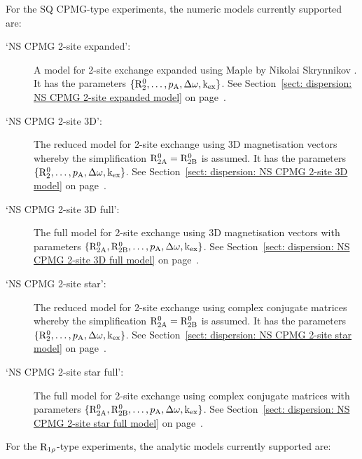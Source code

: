 For the SQ CPMG-type experiments, the numeric models currently supported are:

\begin{description}
\item[`NS CPMG 2-site expanded':]  A model for 2-site exchange expanded using Maple by Nikolai Skrynnikov \citep{Tollinger01}.  It has the parameters $\{\mathrm{R}_2^0, \dots, p_\textrm{A}, \Delta\omega, \textrm{k}_\textrm{ex}\}$.  See Section~\ref{sect: dispersion: NS CPMG 2-site expanded model} on page~\pageref{sect: dispersion: NS CPMG 2-site expanded model}.
\item[`NS CPMG 2-site 3D':]  The reduced model for 2-site exchange using 3D magnetisation vectors whereby the simplification $\mathrm{R}_\mathrm{2A}^0 = \mathrm{R}_\mathrm{2B}^0$ is assumed.  It has the parameters $\{\mathrm{R}_2^0, \dots, p_\textrm{A}, \Delta\omega, \textrm{k}_\textrm{ex}\}$.  See Section~\ref{sect: dispersion: NS CPMG 2-site 3D model} on page~\pageref{sect: dispersion: NS CPMG 2-site 3D model}.
\item[`NS CPMG 2-site 3D full':]  The full model for 2-site exchange using 3D magnetisation vectors with parameters $\{\mathrm{R}_\mathrm{2A}^0, \mathrm{R}_\mathrm{2B}^0, \dots, p_\textrm{A}, \Delta\omega, \textrm{k}_\textrm{ex}\}$.  See Section~\ref{sect: dispersion: NS CPMG 2-site 3D full model} on page~\pageref{sect: dispersion: NS CPMG 2-site 3D full model}.
\item[`NS CPMG 2-site star':]  The reduced model for 2-site exchange using complex conjugate matrices whereby the simplification $\mathrm{R}_\mathrm{2A}^0 = \mathrm{R}_\mathrm{2B}^0$ is assumed.  It has the parameters $\{\mathrm{R}_2^0, \dots, p_\textrm{A}, \Delta\omega, \textrm{k}_\textrm{ex}\}$.  See Section~\ref{sect: dispersion: NS CPMG 2-site star model} on page~\pageref{sect: dispersion: NS CPMG 2-site star model}.
\item[`NS CPMG 2-site star full':]  The full model for 2-site exchange using complex conjugate matrices with parameters $\{\mathrm{R}_\mathrm{2A}^0, \mathrm{R}_\mathrm{2B}^0, \dots, p_\textrm{A}, \Delta\omega, \textrm{k}_\textrm{ex}\}$.  See Section~\ref{sect: dispersion: NS CPMG 2-site star full model} on page~\pageref{sect: dispersion: NS CPMG 2-site star full model}.
\end{description}


For the $\mathrm{R}_{1\rho}$-type experiments, the analytic models currently supported are:

